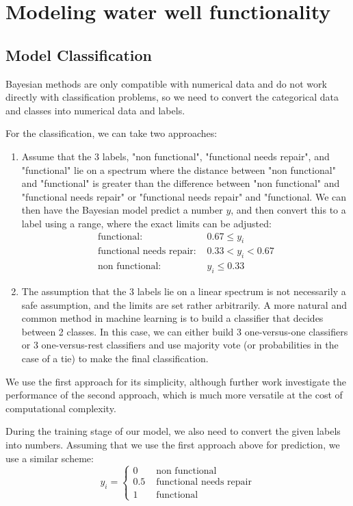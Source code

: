 \documentclass{article} %
\begin{document}
\section{Modeling water well functionality}

\subsection{Model Classification}

Bayesian methods are only compatible with numerical data and do not work directly with classification problems, so we need to convert the categorical data and classes into numerical data and labels.

For the classification, we can take two approaches:
\begin{enumerate}
\item Assume that the 3 labels, "non functional", "functional needs repair", and "functional" lie on a spectrum where the distance between "non functional" and "functional" is greater than the difference between "non functional" and "functional needs repair" or "functional needs repair" and "functional. We can then have the Bayesian model predict a number $y$, and then convert this to a label using a range, where the exact limits can be adjusted:
\begin{align*}
\text{functional: } & 0.67\leq y_i \\
\text{functional needs repair: } & 0.33<y_i<0.67 \\
\text{non functional: } &  y_i \leq 0.33
\end{align*}
\item The assumption that the 3 labels lie on a linear spectrum is not necessarily a safe assumption, and the limits are set rather arbitrarily. A more natural and common method in machine learning is to build a classifier that decides between 2 classes. In this case, we can either build 3 one-versus-one classifiers or 3 one-versus-rest classifiers and use majority vote (or probabilities in the case of a tie) to make the final classification.
\end{enumerate}

We use the first approach for its simplicity, although further work investigate the performance of the second approach, which is much more versatile at the cost of computational complexity.

During the training stage of our model, we also need to convert the given labels into numbers. Assuming that we use the first approach above for prediction, we use a similar scheme:
\begin{equation*}
y_i = 
\begin{cases}
0 & \text{ non functional}\\
0.5 & \text{ functional needs repair}\\
1 & \text{ functional}
\end{cases}
\end{equation*}
\end{document}
